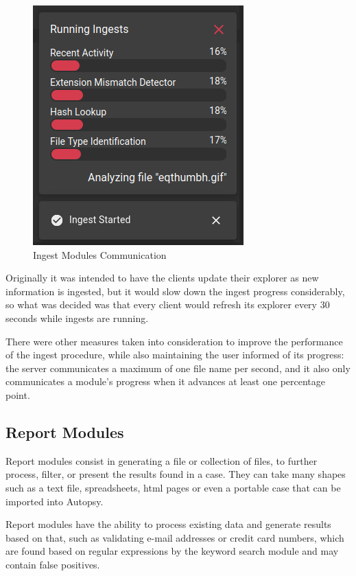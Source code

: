 \begin{figure}[ht]
 \centering
 \includegraphics[width=0.55\linewidth]{imgs/modules.png}
 \caption{Ingest Modules Communication}
 \label{fig:modules}
\end{figure}

Originally it was intended to have the clients update their explorer as new information is ingested, but it would slow down the ingest progress considerably, so what was decided was that every client would refresh 
its explorer every 30 seconds while ingests are running.

There were other measures taken into consideration to improve the performance of the ingest procedure, while also maintaining the user informed of its progress: the server communicates a maximum of one file name per
second, and it also only communicates a module's progress when it advances at least one percentage point.

\subsection{Report Modules}

Report modules consist in generating a file or collection of files, to further process, filter, or present the results found in a case. They can take many shapes such as a text file, spreadsheets, \acrshort{html} pages or even a portable case that can be imported into Autopsy.

Report modules have the ability to process existing data and generate results based on that, such as validating e-mail addresses or credit card numbers, 
which are found based on regular expressions by the keyword search module and may contain false positives.

